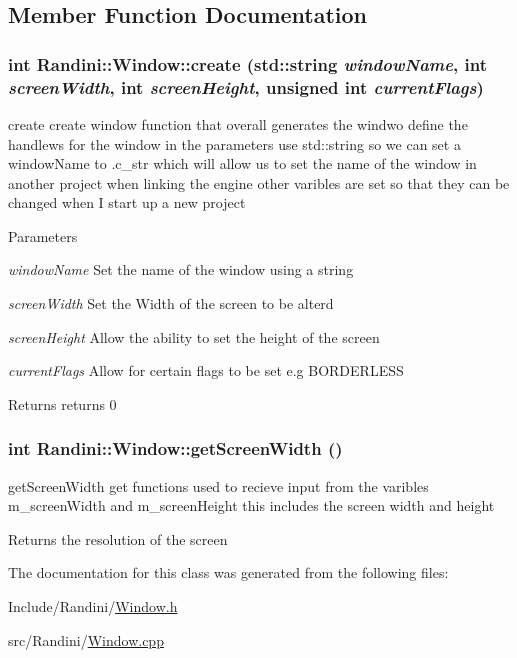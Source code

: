 \subsection{Member Function Documentation}
\hypertarget{classRandini_1_1Window_a74f33cf737af665902138f80cc779cb5}{
\subsubsection[{create}]{\setlength{\rightskip}{0pt plus 5cm}int Randini::Window::create (std::string {\em windowName}, \/  int {\em screenWidth}, \/  int {\em screenHeight}, \/  unsigned int {\em currentFlags})}}
\label{classRandini_1_1Window_a74f33cf737af665902138f80cc779cb5}


create create window function that overall generates the windwo define the handlews for the window in the parameters use std::string so we can set a windowName to .c\_\-str which will allow us to set the name of the window in another project when linking the engine other varibles are set so that they can be changed when I start up a new project 
\begin{DoxyParams}{Parameters}
\item[{\em windowName}]Set the name of the window using a string \item[{\em screenWidth}]Set the Width of the screen to be alterd \item[{\em screenHeight}]Allow the ability to set the height of the screen \item[{\em currentFlags}]Allow for certain flags to be set e.g BORDERLESS \end{DoxyParams}
\begin{DoxyReturn}{Returns}
returns 0 
\end{DoxyReturn}
\hypertarget{classRandini_1_1Window_a7b4ddf85609bbe27f2800ff05a0130dc}{
\subsubsection[{getScreenWidth}]{\setlength{\rightskip}{0pt plus 5cm}int Randini::Window::getScreenWidth ()}}
\label{classRandini_1_1Window_a7b4ddf85609bbe27f2800ff05a0130dc}


getScreenWidth get functions used to recieve input from the varibles m\_\-screenWidth and m\_\-screenHeight this includes the screen width and height \begin{DoxyReturn}{Returns}
the resolution of the screen 
\end{DoxyReturn}


The documentation for this class was generated from the following files:\begin{DoxyCompactItemize}
\item 
Include/Randini/\hyperlink{Window_8h}{Window.h}\item 
src/Randini/\hyperlink{Window_8cpp}{Window.cpp}\end{DoxyCompactItemize}
